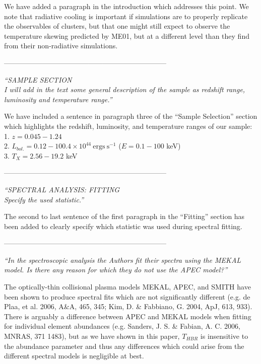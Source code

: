 \documentclass[11pt]{article}
\begin{document}
We have added a paragraph in the introduction which addresses this
point. We note that radiative cooling is important if simulations are
to properly replicate the observables of clusters, but that one might
still expect to observe the temperature skewing predicted by ME01, but
at a different level than they find from their non-radiative
simulations.

---------------------------------------------------------------------

\textit{
``{SAMPLE SECTION}\\
I will add in the text some general description of the sample as
redshift range, luminosity and temperature range.''
}

We have included a sentence in paragraph three of the ``Sample
Selection'' section which highlights the redshift, luminosity, and
temperature ranges of our sample:\\
1. $z = 0.045-1.24$\\
2. $L_{bol.} = 0.12-100.4\times10^{44} \mathrm{~ergs~s}^{-1}$ ($E = 0.1-100$ keV)\\
3. $T_X = 2.56-19.2$ keV

---------------------------------------------------------------------

\textit{
``{SPECTRAL ANALYSIS: FITTING}\\
Specify the used statistic.''
}

The second to last sentence of the first paragraph in the ``Fitting''
section has been added to clearly specify which statistic was used
during spectral fitting.

---------------------------------------------------------------------

\textit{
``In the spectroscopic analysis the Authors fit their spectra using the
MEKAL model. Is there any reason for which they do not use the APEC
model?''
}

The optically-thin collisional plasma models MEKAL, APEC, and SMITH
have been shown to produce spectral fits which are not significantly
different (e.g. de Plaa, et al. 2006, A\&A, 465, 345; Kim, D. \&
Fabbiano, G. 2004, ApJ, 613, 933). There is arguably a difference
between APEC and MEKAL models when fitting for individual element
abundances (e.g. Sanders, J. S. \& Fabian, A. C.  2006, MNRAS, 371
1483), but as we have shown in this paper, $T_{HBR}$ is insensitive to
the abundance parameter and thus any differences which could arise
from the different spectral models is negligible at best.
\end{document}
